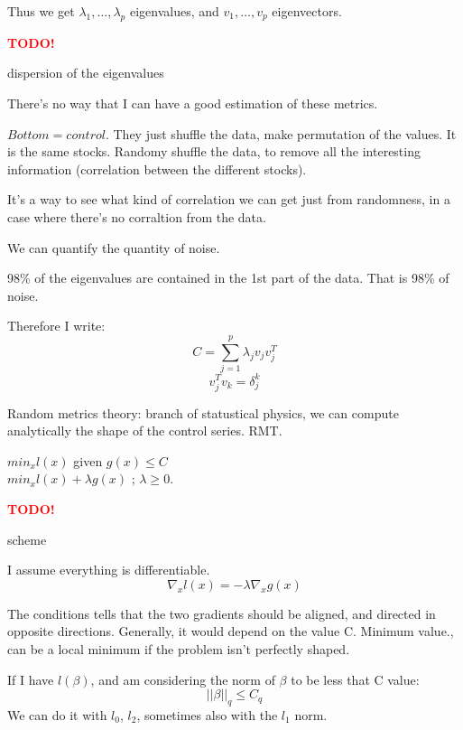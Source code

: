 \documentclass[a4paper]{tufte-book}
\newcommand{\TODO}{\textcolor{red}{\bf TODO!}\xspace}
\begin{document}
Thus we get $\lambda_1, … , \lambda_p$ eigenvalues, and $v_1, … , v_p$ eigenvectors.

\begin{marginfigure}
\TODO
\caption{dispersion of the eigenvalues}
\label{fig2}
\end{marginfigure}

There’s no way that I can have a good estimation of these metrics.

$Bottom = control$. They just shuffle the data, make permutation of the values. It is the same stocks. Randomy shuffle the data, to remove all the interesting information (correlation between the different stocks).

It’s a way to see what kind of correlation we can get just from randomness, in a case where there’s no corraltion from the data.

We can quantify the quantity of noise.

98\% of the eigenvalues are contained in the 1st part of the data. That is 98\% of noise.

Therefore I write:
\begin{equation}
C = \sum_{j=1}^p \lambda_j v_j v_j^T
\end{equation} 
\begin{equation}
v_j^T v_k = \delta_j^k
\end{equation}

Random metrics theory: branch of statustical physics, we can compute analytically the shape of the control series. RMT.

$min_x l(x)$ given $g(x)\leq C$\\
$min_x l(x) + \lambda g(x)$  ; $\lambda \geq 0$.

\begin{marginfigure}
\TODO
\caption{scheme}
\label{fig3}
\end{marginfigure}


I assume everything is differentiable.
\begin{equation}
\nabla_x l(x) = -\lambda \nabla_x g(x)
\end{equation}

The conditions tells that the two gradients should be aligned, and directed in opposite directions.
Generally, it would depend on the value C.
Minimum value., can be a local minimum if the problem isn’t perfectly shaped.

If I have $l(\beta)$, and am considering the norm of $\beta$ to be less that C value:
\begin{equation}
||\beta||_q \leq C_q
\end{equation}
We can do it with $l_0$, $l_2$, sometimes also with the $l_1$ norm.
\end{document}
